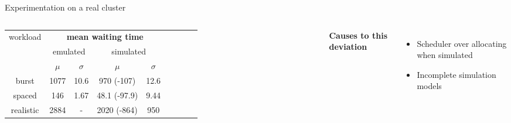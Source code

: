 \documentclass[12pt, aspectratio=43]{beamer}
\begin{document}
\begin{frame}{Experimentation on a real cluster}
\begin{columns}
		\vspace{1ex}
		\begin{adjustbox}{max width=\textwidth}
			\begin{tabular}{|c|c|c|c|c|c|c|c|c|}
				\hline

				\multirow{3}{*}{workload} & \multicolumn{4}{c|}{\textbf{mean waiting time}}\\

				\cline{2-5}

				& \multicolumn{2}{c|}{emulated} &
				\multicolumn{2}{c|}{simulated} \\

				\cline{2-5}

				& $\mu$ & $\sigma$ & $\mu$ & $\sigma$ \\

				\hline

				burst & 1077 & 10.6 & 970 (-107) & 12.6 \\
				spaced & 146 & 1.67 & 48.1 (-97.9) & 9.44 \\
				realistic & 2884 & - & 2020 (-864) & 950 \\
				\hline
			\end{tabular}
		\end{adjustbox}

		\textbf{Causes to this deviation}
		\begin{itemize}
			\item Scheduler over allocating when simulated
			\item Incomplete simulation models
		\end{itemize}
	\end{columns}
\end{frame}
\end{document}
